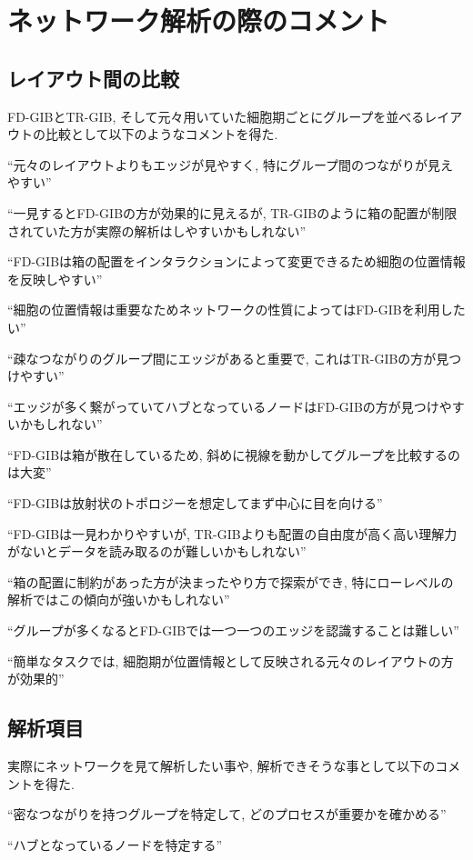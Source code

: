 \documentclass{kuee}
\begin{document}
\section{ネットワーク解析の際のコメント}

\subsection{レイアウト間の比較}
FD-GIBとTR-GIB, そして元々用いていた細胞期ごとにグループを並べるレイアウトの比較として以下のようなコメントを得た.

``元々のレイアウトよりもエッジが見やすく, 特にグループ間のつながりが見えやすい''

``一見するとFD-GIBの方が効果的に見えるが, TR-GIBのように箱の配置が制限されていた方が実際の解析はしやすいかもしれない''

``FD-GIBは箱の配置をインタラクションによって変更できるため細胞の位置情報を反映しやすい''

``細胞の位置情報は重要なためネットワークの性質によってはFD-GIBを利用したい''

``疎なつながりのグループ間にエッジがあると重要で, これはTR-GIBの方が見つけやすい''

``エッジが多く繋がっていてハブとなっているノードはFD-GIBの方が見つけやすいかもしれない''

``FD-GIBは箱が散在しているため, 斜めに視線を動かしてグループを比較するのは大変''

``FD-GIBは放射状のトポロジーを想定してまず中心に目を向ける''

``FD-GIBは一見わかりやすいが, TR-GIBよりも配置の自由度が高く高い理解力がないとデータを読み取るのが難しいかもしれない''

``箱の配置に制約があった方が決まったやり方で探索ができ, 特にローレベルの解析ではこの傾向が強いかもしれない''

``グループが多くなるとFD-GIBでは一つ一つのエッジを認識することは難しい''

``簡単なタスクでは, 細胞期が位置情報として反映される元々のレイアウトの方が効果的''

\subsection{解析項目}
実際にネットワークを見て解析したい事や, 解析できそうな事として以下のコメントを得た.

``密なつながりを持つグループを特定して, どのプロセスが重要かを確かめる''

``ハブとなっているノードを特定する''
\end{document}
